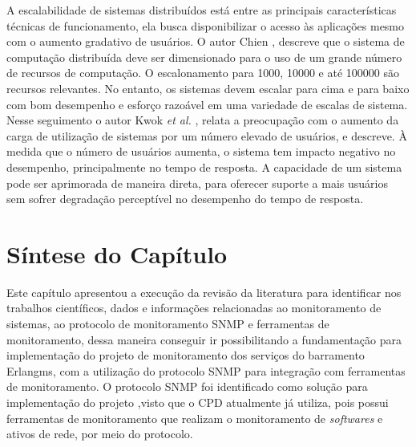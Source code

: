 A escalabilidade de sistemas distribuídos está entre as principais características técnicas de funcionamento, ela busca disponibilizar o acesso às aplicações mesmo com o aumento gradativo de usuários. O autor Chien \cite{1015543}, descreve que o sistema de computação distribuída deve ser dimensionado para o uso de um grande número de recursos de computação. O escalonamento para 1000, 10000 e até 100000 são recursos relevantes. No entanto, os sistemas devem escalar para cima e para baixo com bom desempenho e esforço razoável em uma variedade de escalas de sistema. Nesse seguimento o autor Kwok \textit{et al.} \cite{4359423}, relata a preocupação com o aumento da carga de utilização de sistemas por um número elevado de usuários, e descreve. À medida que o número de usuários aumenta, o sistema tem impacto negativo no desempenho, principalmente no tempo de resposta. A capacidade de um sistema pode ser aprimorada de maneira direta, para oferecer suporte a mais usuários sem sofrer degradação perceptível no desempenho do tempo de resposta. 

\section{Síntese do Capítulo}

Este capítulo apresentou a execução da revisão da literatura para identificar nos trabalhos científicos, dados e informações relacionadas ao monitoramento de sistemas, ao protocolo de monitoramento \acrshort{SNMP} e ferramentas de monitoramento, dessa maneira conseguir ir possibilitando a fundamentação para implementação do projeto de monitoramento dos serviços do barramento Erlangms, com a utilização do protocolo \acrshort{SNMP} para integração com ferramentas de monitoramento. O protocolo \acrshort{SNMP} foi identificado como solução para implementação do projeto ,visto que o \acrshort{CPD} atualmente já utiliza, pois  possui ferramentas de monitoramento que realizam o monitoramento de \textit{softwares} e ativos de rede, por meio do protocolo. 

